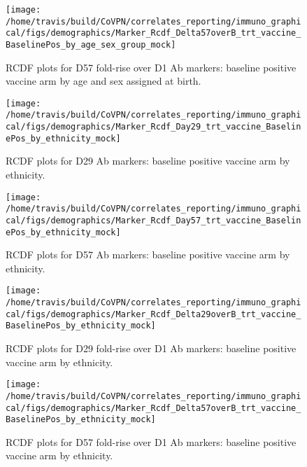 \documentclass[]{book}
\theoremstyle{definition}
\theoremstyle{definition}
\theoremstyle{definition}
\newcommand{\1}{\mathbbm{1}}
\begin{document}
\clearpage
\begin{figure}[H]

{\centering \texttt{[image: /home/travis/build/CoVPN/correlates\_reporting/immuno\_graphical/figs/demographics/Marker\_Rcdf\_Delta57overB\_trt\_vaccine\_BaselinePos\_by\_age\_sex\_group\_mock]} 

}

\caption{RCDF plots for D57 fold-rise over D1 Ab markers: baseline positive vaccine arm by age and sex assigned at birth.}\label{fig:unnamed-chunk-111}
\end{figure}

\clearpage
\begin{figure}[H]

{\centering \texttt{[image: /home/travis/build/CoVPN/correlates\_reporting/immuno\_graphical/figs/demographics/Marker\_Rcdf\_Day29\_trt\_vaccine\_BaselinePos\_by\_ethnicity\_mock]} 

}

\caption{RCDF plots for D29 Ab markers: baseline positive vaccine arm by ethnicity.}\label{fig:unnamed-chunk-112}
\end{figure}

\clearpage
\begin{figure}[H]

{\centering \texttt{[image: /home/travis/build/CoVPN/correlates\_reporting/immuno\_graphical/figs/demographics/Marker\_Rcdf\_Day57\_trt\_vaccine\_BaselinePos\_by\_ethnicity\_mock]} 

}

\caption{RCDF plots for D57 Ab markers: baseline positive vaccine arm by ethnicity.}\label{fig:unnamed-chunk-113}
\end{figure}

\clearpage
\begin{figure}[H]

{\centering \texttt{[image: /home/travis/build/CoVPN/correlates\_reporting/immuno\_graphical/figs/demographics/Marker\_Rcdf\_Delta29overB\_trt\_vaccine\_BaselinePos\_by\_ethnicity\_mock]} 

}

\caption{RCDF plots for D29 fold-rise over D1 Ab markers: baseline positive vaccine arm by ethnicity.}\label{fig:unnamed-chunk-114}
\end{figure}

\clearpage
\begin{figure}[H]

{\centering \texttt{[image: /home/travis/build/CoVPN/correlates\_reporting/immuno\_graphical/figs/demographics/Marker\_Rcdf\_Delta57overB\_trt\_vaccine\_BaselinePos\_by\_ethnicity\_mock]} 

}

\caption{RCDF plots for D57 fold-rise over D1 Ab markers: baseline positive vaccine arm by ethnicity.}\label{fig:unnamed-chunk-115}
\end{figure}
\end{document}
